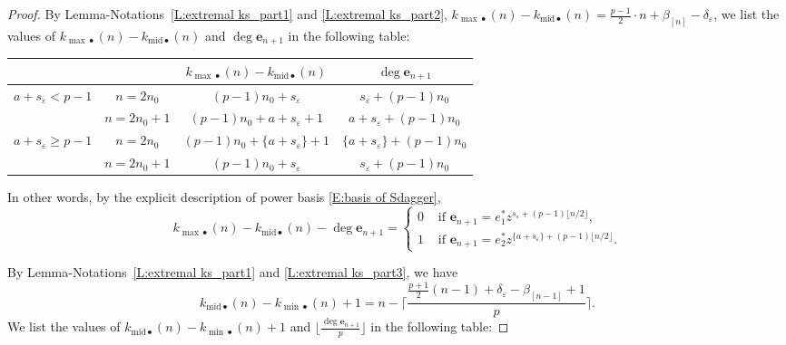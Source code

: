 \documentclass[12pt]{amsart}
\theoremstyle{definition}
\numberwithin{equation}{subsection}
\def\bfe{\mathbf{e}}
\newcommand{\midd}{\mathrm{mid}}
\begin{document}
\begin{proof}
By Lemma-Notations~\ref{L:extremal ks_part1} and \ref{L:extremal ks_part2},  $k_{{\max}\bullet}(n)-k_{\midd \bullet}(n)=\frac{p-1}{2}\cdot n+\beta_{[n]}-\delta_{\varepsilon}$, we list the values of $k_{{\max}\bullet}(n)-k_{\midd \bullet}(n)$ and $\deg \bfe_{n+1}$ in the following table:
\begin{center}
\begin{tabular}{|c|c|c|c|}
\hline
 & &$k_{{\max} \bullet}(n)-k_{\midd \bullet}(n)$ & $\deg \bfe_{n+1}$ 
\\
\hline
\multirow{2}{*}{$a+s_\varepsilon < p-1$} & $n=2n_0$ & $(p-1)n_0+s_\varepsilon$& $s_\varepsilon+(p-1)n_0$
\\
\cline{2-4}
& $n=2n_0+1$ &  $(p-1)n_0+a+s_\varepsilon+1$ & $a+s_\varepsilon+(p-1)n_0$
\\
\hline 
\multirow{2}{*}{
$a+s_\varepsilon \geq p-1$} & $n=2n_0$ &$(p-1)n_0+\{a+s_\varepsilon\}+1$ & $\{a+s_\varepsilon\}+(p-1)n_0$ 
\\
\cline{2-4} & $n=2n_0+1$ & $(p-1)n_0+s_\varepsilon$ & $s_\varepsilon+(p-1)n_0$ 
\\
\hline
\end{tabular}
\end{center}
In other words, by the explicit description of power basis \eqref{E:basis of Sdagger},
\begin{equation}
\label{E:kmax-kmid}
k_{\max {\bullet}}(n) - k_{\midd\bullet}(n)  - \deg \bfe_{n+1} = \begin{cases}
0& \textrm{ if }\bfe_{n+1} = e_1^*z^{s_\varepsilon+ (p-1)\lfloor n/2\rfloor},
\\
1 & \textrm{ if }\bfe_{n+1} = e_2^*z^{\{a+s_\varepsilon\}+ (p-1)\lfloor n/2\rfloor}.
\end{cases}
\end{equation}

By Lemma-Notations~\ref{L:extremal ks_part1} and \ref{L:extremal ks_part3}, we have 
$$
k_{{\midd}\bullet}(n)-k_{{\min} \bullet}(n)+1=n-\Big\lceil \frac{\frac{p+1}{2}(n-1)+\delta_\varepsilon-\beta_{[n-1]}+1}{p}\Big\rceil.$$
We list the values of $k_{{\midd}\bullet}(n)-k_{{\min}\bullet}(n)+1$ and $\lfloor\frac {\deg \bfe_{n+1}}p\rfloor$ in the following table:


\end{proof}
\end{document}
